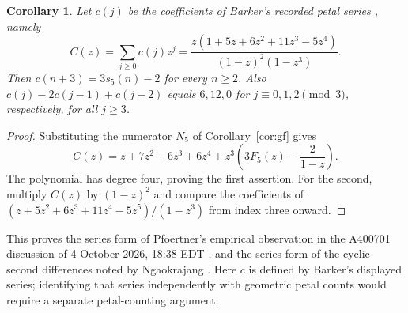 \documentclass[11pt]{article}
\newtheorem{corollary}[theorem]{Corollary}
\begin{document}
\begin{corollary}\label{cor:petal}
Let $c(j)$ be the coefficients of Barker's recorded petal series
\cite[FORMULA, 13 December 2015]{petals}, namely
\[
 C(z)=\sum_{j\geq0}c(j)z^j
 =\frac{z(1+5z+6z^2+11z^3-5z^4)}{(1-z)^2(1-z^3)}.
\]
Then $c(n+3)=3s_5(n)-2$ for every $n\geq2$.
Also $c(j)-2c(j-1)+c(j-2)$ equals $6,12,0$ for
$j\equiv0,1,2\pmod3$, respectively, for all $j\geq3$.
\end{corollary}
\begin{proof}
Substituting the numerator $N_5$ of Corollary~\ref{cor:gf} gives
\[
 C(z)=z+7z^2+6z^3+6z^4
       +z^3\left(3F_5(z)-\frac{2}{1-z}\right).
\]
The polynomial has degree four, proving the first assertion.
For the second, multiply $C(z)$ by $(1-z)^2$ and compare the coefficients
of $(z+5z^2+6z^3+11z^4-5z^5)/(1-z^3)$ from index three onward.
\end{proof}
This proves the series form of Pfoertner's empirical observation in the
A400701 discussion of 4 October 2026, 18:38 EDT \cite{fivehistory}, and the
series form of the cyclic second differences noted by Ngaokrajang
\cite[COMMENTS]{petals}. Here $c$ is defined by Barker's displayed series;
identifying that series independently with geometric petal counts would
require a separate petal-counting argument.
\end{document}
